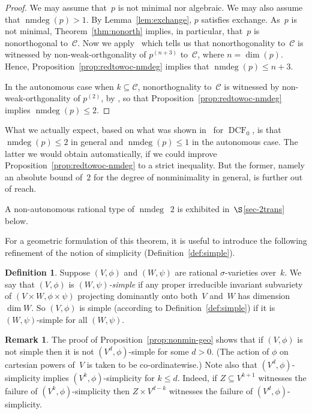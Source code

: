 \documentclass[\DocOpts]{amsart}
\theoremstyle{definition}
\newtheorem{remark}[theorem]{Remark}
\newtheorem{definition}[theorem]{Definition}
\def\dcf{\operatorname{DCF}}
\def\nmdeg{\operatorname{nmdeg}}
\def\C{\mathcal{C}}
\newcommand{\<}{\langle}
\renewcommand{\>}{\rangle}
\begin{document}
\begin{proof}
We may assume that~$p$ is not minimal nor algebraic.
We may also assume that $\nmdeg(p)>1$.
By Lemma~\ref{lem:exchange}, $p$ satisfies exchange.
As~$p$ is not minimal, Theorem~\ref{thm:nonorth} implies, in particular, that~$p$ is nonorthogonal to~$\C$.
Now we apply~\cite[Theorem~5.7]{qfint} which tells us that nonorthogonality to~$\C$ is witnessed by non-weak-orthgonality of $p^{(n+3)}$ to~$\C$, where $n=\dim(p)$.
Hence, Proposition~\ref{prop:redtowoc-nmdeg} implies that $\nmdeg(p)\leq n+3$.

In the autonomous case when $k\subseteq\C$, nonorthognality to~$\C$ is witnessed by non-weak-orthgonality of $p^{(2)}$, by \cite[Corollary~5.3]{qfint}, so that Proposition~\ref{prop:redtowoc-nmdeg} implies $\nmdeg(p)\leq 2$.
\end{proof}

What we actually expect, based on what was shown in~\cite{nmdeg2} for $\dcf_0$, is that $\nmdeg(p)\leq 2$ in general and $\nmdeg(p)\leq 1$ in the autonomous case.
The latter we would obtain automatically, if we could improve Proposition~\ref{prop:redtowoc-nmdeg} to a strict inequality.
But the former, namely an absolute bound of~$2$ for the degree of nonminimality in general, is further out of reach.

A non-autonomous rational type of $\nmdeg$~$2$ is exhibited in~$\S$\ref{sec-2trans} below.


For a geometric formulation of this theorem, it is useful to introduce the following refinement of the notion of simplicity (Definition~\ref{def:simple}).

\begin{definition}
\label{def:wsimple}
Suppose $(V,\phi)$ and $(W,\psi)$ are rational $\sigma$-varieties over~$k$.
We say that $(V,\phi)$ is {\em $(W,\psi)$-simple} if any proper irreducible invariant subvariety of $(V\times W,\phi\times\psi)$ projecting dominantly onto both~$V$ and~$W$ has dimension $\dim W$.
So $(V,\phi)$ is simple (according to Definition~\ref{def:simple}) if it is $(W,\psi)$-simple for all $(W,\psi)$.
\end{definition}

\begin{remark}
The proof of Proposition~\ref{prop:nonmin-geo} shows that if $(V,\phi)$ is not simple then it is not $(V^d,\phi)$-simple for some $d>0$.
(The action of $\phi$ on cartesian powers of~$V$ is taken to be co-ordinatewise.)
Note also that $(V^d,\phi)$-simplicity implies $(V^k,\phi)$-simplicity for $k\leq d$.
Indeed, if $Z\subseteq V^{k+1}$ witnesses the failure of $(V^k,\phi)$-simplicity then $Z\times V^{d-k}$ witnesses the failure of $(V^d,\phi)$-simplicity.
\end{remark}
\end{document}
